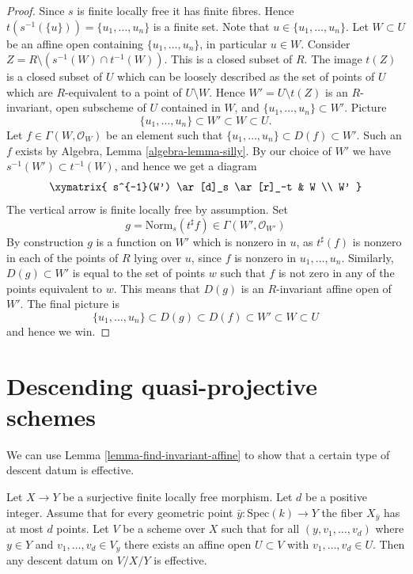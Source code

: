 \begin{proof}
Since $s$ is finite locally free it has finite fibres. Hence
$t(s^{-1}(\{u\})) = \{u_1, \ldots, u_n\}$ is a finite set.
Note that $u \in \{u_1, \ldots, u_n\}$.
Let $W \subset U$ be an affine open containing $\{u_1, \ldots, u_n\}$,
in particular $u \in W$. Consider
$Z = R \setminus (s^{-1}(W) \cap t^{-1}(W))$. This is a closed subset
of $R$. The image $t(Z)$ is a closed subset of $U$ which can be loosely
described as the set of points of $U$ which are $R$-equivalent to a point
of $U \setminus W$. Hence $W' = U \setminus t(Z)$ is an $R$-invariant, open
subscheme of $U$ contained in $W$, and $\{u_1, \ldots, u_n\} \subset W'$.
Picture
$$
\{u_1, \ldots, u_n\} \subset W' \subset W \subset U.
$$
Let $f \in \Gamma(W, \mathcal{O}_W)$ be an element such that
$\{u_1, \ldots, u_n\} \subset D(f) \subset W'$. Such an $f$ exists by
Algebra, Lemma \ref{algebra-lemma-silly}. By our choice of $W'$ we
have $s^{-1}(W') \subset t^{-1}(W)$, and hence we get a diagram
$$
\xymatrix{
s^{-1}(W') \ar[d]_s \ar[r]_-t & W \\
W'
}
$$
The vertical arrow is finite locally free by assumption. Set
$$
g = \text{Norm}_s(t^\sharp f) \in \Gamma(W', \mathcal{O}_{W'})
$$
By construction $g$ is a function on $W'$ which is
nonzero in $u$, as $t^\sharp(f)$ is nonzero in each of the points of
$R$ lying over $u$, since $f$ is nonzero in $u_1, \ldots, u_n$.
Similarly, $D(g) \subset W'$ is equal to the
set of points $w$ such that $f$ is not zero in any of the points
equivalent to $w$. This means that $D(g)$ is an
$R$-invariant affine open of $W'$. The final picture is
$$
\{u_1, \ldots, u_n\} \subset D(g) \subset D(f) \subset W' \subset W \subset U
$$
and hence we win.
\end{proof}







\section{Descending quasi-projective schemes}
\label{section-quasi-projective}

\noindent
We can use Lemma \ref{lemma-find-invariant-affine}
to show that a certain type of descent datum is effective.

\begin{lemma}
\label{lemma-descend-along-finite-with-bound}
Let $X \to Y$ be a surjective finite locally free morphism.
Let $d$ be a positive integer. Assume that for every geometric
point $\bar{y} : \mathrm{Spec}(k) \to Y$ the fiber $X_{\bar{y}}$
has at most $d$ points.
Let $V$ be a scheme over $X$ such that for all
$(y, v_1, \ldots, v_d)$ where $y \in Y$ and
$v_1, \ldots, v_d \in V_y$ there exists an affine open
$U \subset V$ with $v_1, \ldots, v_d \in U$.
Then any descent datum on $V/X/Y$ is effective.
\end{lemma}

